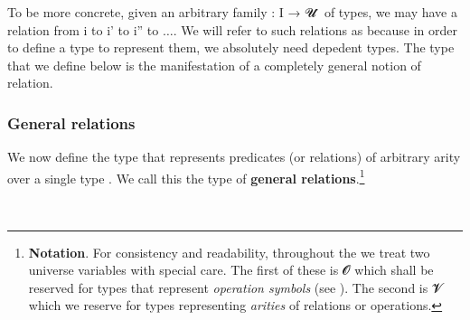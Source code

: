 \documentclass[a4paper,UKenglish,cleveref,autoref,thm-restate,11pt]{lipics-v2021}
\begin{document}
To be more concrete, given an arbitrary family  \as : \ab I \as → \ab 𝓤 \af ̇ of types, we may have a relation from  \ab i to  \ab i' to  \ab i'' to $\ldots$. We will refer to such relations as  because in order to define a type to represent them, we absolutely need depedent types. The  type that we define below is the manifestation of a completely general notion of relation.

\subsubsection{General relations}\label{general-relations}

We now define the type  that represents predicates (or relations) of arbitrary arity over a single type . We call this the type of \textbf{general relations}.\footnote{%
\textbf{Notation}. For consistency and readability, throughout the \ualib we treat two universe variables with special care. The first of these is 𝓞 which shall be reserved for types that represent
\emph{operation symbols} (see \ualibSignatures). The second is 𝓥 which we reserve for types representing \emph{arities} of relations or operations.}
\ccpad
\begin{code}%
\>[0]\AgdaSpace{}%
\AgdaSymbol{:}\AgdaSpace{}%
\AgdaSpace{}%
\AgdaSpace{}%
\AgdaSpace{}%
\AgdaSpace{}%
\AgdaSpace{}%
\AgdaSpace{}%
\AgdaSymbol{(}\AgdaSpace{}%
\AgdaSymbol{:}\AgdaSpace{}%
\AgdaSymbol{)}\AgdaSpace{}%
\AgdaSpace{}%
\AgdaSpace{}%
\AgdaSpace{}%
\AgdaSpace{}%
\AgdaSpace{}%
\AgdaSpace{}%
\AgdaSpace{}%
\<%
\\
\>[0]\AgdaSpace{}%
\AgdaSpace{}%
\AgdaSpace{}%
\AgdaSpace{}%
\AgdaSymbol{=}\AgdaSpace{}%
\AgdaSymbol{(}\AgdaSpace{}%
\AgdaSpace{}%
\AgdaSymbol{)}\AgdaSpace{}%
\AgdaSpace{}%
\AgdaSpace{}%
\<%
\end{code}
\end{document}
